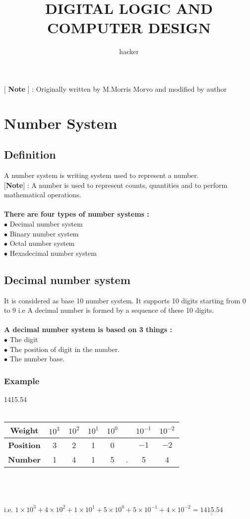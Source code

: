 \documentclass{article}
\author{hacker}
\begin{document}
	\title{DIGITAL LOGIC AND COMPUTER DESIGN}
	\maketitle
	
	$[$ \textbf{Note} $]$ : Originally written by M.Morris Morvo and modified by author
	
	\newpage
	
	\section{Number System}
	\subsection{Definition}
	A number system is writing system used to represent a number. \\
	$[$\textbf{Note}$]$ : A number is used to represent counts, quantities and to perform mathematical operations.
	\\ \\
	\textbf{There are four types of number systems :} \\
	$ \bullet $ Decimal number system \\
	$ \bullet $ Binary number system \\
	$ \bullet $ Octal number system \\
	$ \bullet $ Hexadecimal number system
	
	\subsection{Decimal number system}
	It is considered as base 10 number system. It supports 10 digits starting from 0 to 9 i.e A decimal number is formed by a sequence of these 10 digits.
	\\ \\
	\textbf{A decimal number system is based on 3 things :} \\
	$ \bullet $ The digit \\
	$ \bullet $ The position of digit in the number. \\
	$ \bullet $ The number base.
	
	\subsubsection{Example}
	1415.54 \\ \\
		\begin{tabular}{|c|c|c|c|c|c|c|c|}
			\hline
			\textbf{Weight}	& $ {10}^{3^{^{^{}}}} $ & $ 10^2 $ & $ 10^1 $ & $ 10^0 $ & & $ {10}^{-1} $ & $ {10}^{-2} $ \\ \hline
			\textbf{Position} & 3 & 2 & 1 & 0 & & $ -1 $ & $ -2 $
			\\ \hline
			\textbf{Number} & 1 & 4 & 1 & 5 & . & 5 & 4 
			\\ \hline
		\end{tabular}
	\\ \\ \\
	i.e. $ 1 \times 10^3 + 4 \times 10^2 + 1 \times 10^1 + 5 \times 10^0 + 5 \times 10^{-1} + 4 \times 10^{-2} = \underline{\underline{1415.54}}$ 
	
\end{document}
